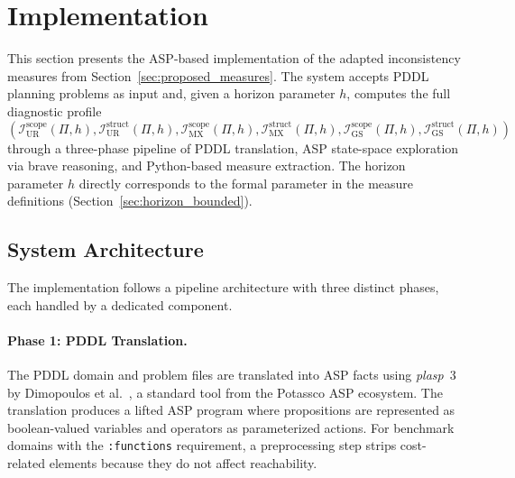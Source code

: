 \section{Implementation}
\label{sec:implementation}

This section presents the \ac{ASP}-based implementation of the adapted inconsistency measures from Section~\ref{sec:proposed_measures}. The system accepts \ac{PDDL} planning problems as input and, given a horizon parameter $h$, computes the full diagnostic profile
\begin{equation*}
    (\mathcal{I}^{\text{scope}}_{\text{UR}}(\Pi, h), \mathcal{I}^{\text{struct}}_{\text{UR}}(\Pi, h), \mathcal{I}^{\text{scope}}_{\text{MX}}(\Pi, h), \mathcal{I}^{\text{struct}}_{\text{MX}}(\Pi, h), \mathcal{I}^{\text{scope}}_{\text{GS}}(\Pi, h), \mathcal{I}^{\text{struct}}_{\text{GS}}(\Pi, h))
\end{equation*}
through a three-phase pipeline of \ac{PDDL} translation, \ac{ASP} state-space exploration via brave reasoning, and Python-based measure extraction. The horizon parameter $h$ directly corresponds to the formal parameter in the measure definitions (Section~\ref{sec:horizon_bounded}).

\subsection{System Architecture}
\label{sec:architecture}

The implementation follows a pipeline architecture with three distinct phases, each handled by a dedicated component.

\paragraph{Phase 1: PDDL Translation.}
The \ac{PDDL} domain and problem files are translated into \ac{ASP} facts using \textit{plasp}~3 by Dimopoulos et al.~\cite{Dimopoulos2019}, a standard tool from the Potassco \ac{ASP} ecosystem. The translation produces a lifted \ac{ASP} program where propositions are represented as boolean-valued variables and operators as parameterized actions. For benchmark domains with the \texttt{:functions} requirement, a preprocessing step strips cost-related elements because they do not affect reachability.

